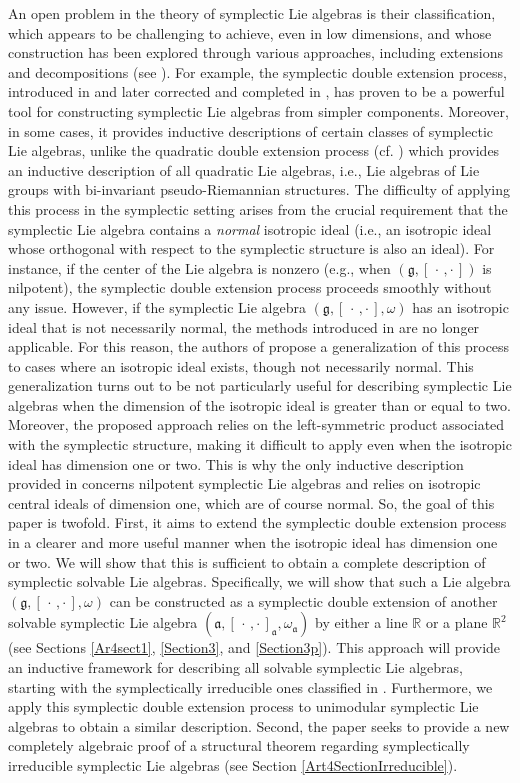 \documentclass[final,1p,times,nopreprintline]{elsarticle}
\theoremstyle{definition}
\numberwithin{equation}{section}
\newcommand{\rel}{\mathbb{R}}
\newcommand{\w}{\omega}
\newcommand{\g}{\mathfrak{g}}
\newcommand{\ai}{\mathfrak{a}}
\numberwithin{equation}{section}
\newcommand{\cro}{[\,\cdot\,,\cdot\,]}
\begin{document}
An open problem in the theory of symplectic Lie algebras is their classification, which appears to be challenging to achieve, even in low dimensions, and whose construction has been explored through various approaches, including extensions and decompositions (see \cite{AM,BaBe,Bau,DM,Fi,Ov}). For example, the symplectic double extension process, introduced in \cite{MR} and later corrected and completed in \cite{DM}, has proven to be a powerful tool for constructing symplectic Lie algebras from simpler components. Moreover, in some cases, it provides inductive descriptions of certain classes of symplectic Lie algebras, unlike the quadratic double extension process (cf. \cite{MR-Q}) which provides an inductive description of all quadratic Lie algebras, i.e., Lie algebras of Lie groups with bi-invariant pseudo-Riemannian structures. The difficulty of applying this process in the symplectic setting arises from the crucial requirement that the symplectic Lie algebra contains a \textit{normal} isotropic ideal (i.e., an isotropic ideal whose orthogonal with respect to the symplectic structure is also an ideal). For instance, if the center of the Lie algebra is nonzero (e.g., when $(\g,\cro)$ is nilpotent), the symplectic double extension process proceeds smoothly without any issue. However, if the symplectic Lie algebra $(\g,\cro,\w)$ has an isotropic ideal that is not necessarily normal, the methods introduced in \cite{MR} are no longer applicable. For this reason, the authors of \cite{DM} propose a generalization of this process to cases where an isotropic ideal exists, though not necessarily normal. This generalization turns out to be not particularly useful for describing symplectic Lie algebras when the dimension of the isotropic ideal is greater than or equal to two. Moreover, the proposed approach relies on the left-symmetric product associated with the symplectic structure, making it difficult to apply even when the isotropic ideal has dimension one or two. This is why the only inductive description provided in \cite{DM} concerns nilpotent symplectic Lie algebras and relies on isotropic central ideals of dimension one, which are of course normal. So, the goal of this paper is twofold. First, it aims to extend the symplectic double extension process in a clearer and more useful manner when the isotropic ideal has dimension one or two. We will show that this is sufficient to obtain a complete description of symplectic solvable Lie algebras. Specifically, we will show that such a Lie algebra $(\g,\cro,\w)$ can be constructed as a symplectic double extension of another solvable symplectic Lie algebra $(\ai,\cro_\ai,\w_\ai)$ by either a line $\rel$ or a plane $\rel^2$ (see Sections \ref{Ar4sect1}, \ref{Section3}, and \ref{Section3p}). This approach will provide an inductive framework for describing all solvable symplectic Lie algebras, starting with the symplectically irreducible ones classified in \cite{Bau}. Furthermore, we apply this symplectic double extension process to unimodular symplectic Lie algebras to obtain a similar description. Second, the paper seeks to provide a new completely algebraic proof of a structural theorem regarding symplectically irreducible symplectic Lie algebras (see Section \ref{Art4SectionIrreducible}).\\
\end{document}
